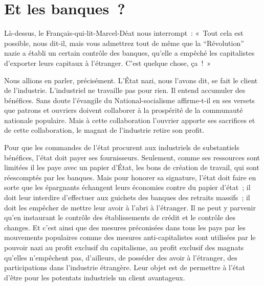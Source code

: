 \documentclass[french,twoside]{book} %
\begin{document}
\section[{Et les banques ?}]{Et les banques ?}
\noindent Là-dessus, le Français-qui-lit-Marcel-Déat nous interrompt : « Tout cela est possible, nous dit-il, mais vous admettrez tout de même que la “Révolution” nazie a établi un certain contrôle des banques, qu’elle a empêché les capitalistes d’exporter leurs capitaux à l’étranger. C’est quelque chose, ça ! »\par
Nous allions en parler, précisément. L’État nazi, nous l’avons dit, se fait le client de l’industrie. L’industriel ne travaille pas pour rien. Il entend accumuler des bénéfices. Sans doute l’évangile du National-socialisme affirme-t-il en ses versets que patrons et ouvriers doivent collaborer à la prospérité de la communauté nationale populaire. Mais à cette collaboration l’ouvrier apporte ses sacrifices et de cette collaboration, le magnat de l’industrie retire son profit.\par
Pour que les commandes de l’état procurent aux industriels de substantiels bénéfices, l’état doit payer ses fournisseurs. Seulement, comme ses ressources sont limitées il les paye avec un papier d’État, les bons de création de travail, qui sont réescomptés par les banques. Mais pour honorer sa signature, l’état doit faire en sorte que les épargnants échangent leurs économies contre du papier d’état ; il doit leur interdire d’effectuer aux guichets des banques des retraits massifs ; il doit les empêcher de mettre leur avoir à l’abri à l’étranger. Il ne peut y parvenir qu’en instaurant le contrôle des établissements de crédit et le contrôle des changes. Et c’est ainsi que des mesures préconisées dans tous les pays par les mouvements populaires comme des mesures anti-capitalistes sont utilisées par le pouvoir nazi au profit exclusif du capitalisme, au profit exclusif des magnats qu’elles n’empêchent pas, d’ailleurs, de posséder des avoir à l’étranger, des participations dans l’industrie étrangère. Leur objet est de permettre à l’état d’être pour les potentats industriels un client avantageux.
\end{document}
